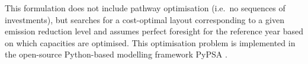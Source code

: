 This formulation does not include pathway optimisation (i.e.~no
sequences of investments), but searches for a cost-optimal layout corresponding
to a given \co emission reduction level and assumes perfect foresight for
the reference year based on which capacities are optimised. This optimisation
problem is implemented in the open-source Python-based modelling framework
PyPSA .
